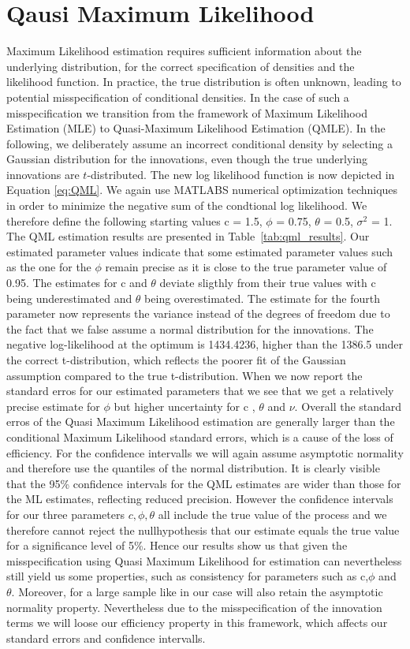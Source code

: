 \documentclass[11pt]{article}
\begin{document}
\section{Qausi Maximum Likelihood}
Maximum Likelihood estimation requires sufficient information about the underlying distribution, for the correct specification of densities and the likelihood function.
In practice, the true distribution is often unknown, leading to potential misspecification of conditional densities. 
In the case of such a misspecification we transition from the framework of 
Maximum Likelihood Estimation (MLE) to Quasi-Maximum Likelihood Estimation (QMLE).
In the following, we deliberately assume an incorrect conditional density by selecting a Gaussian distribution for the innovations, even though the true underlying innovations are \( t \)-distributed.
The new log likelihood function is now depicted in Equation \ref{eq:QML}.
We again use MATLABS numerical optimization techniques in order to minimize the negative sum of the condtional log likelihood.
We therefore define the following starting values c = 1.5, $\phi$ = 0.75, $\theta$ = 0.5, $\sigma^2$ = 1.
The QML estimation results are presented in Table~\ref{tab:qml_results}.
Our estimated parameter values indicate that some estimated parameter values such as the one for the  $\phi$ remain precise as it is close to the true parameter value of 0.95. The estimates for c and $\theta$ deviate sligthly from their true values with c being underestimated and $\theta$ being overestimated.
The estimate for the fourth parameter now represents the variance instead of the degrees of freedom due to the fact that we false assume a normal distribution for the innovations.
The negative log-likelihood at the optimum is 1434.4236, higher than the 1386.5 under the correct t-distribution, which reflects the poorer fit of the Gaussian assumption compared to the true t-distribution.
When we now report the standard erros for our estimated parameters that we  see that we get a relatively precise estimate for $\phi$ but higher uncertainty for c , $\theta$ and $\nu$.
Overall the standard erros of the Quasi Maximum Likelihood estimation are generally larger than the conditional Maximum Likelihood standard errors, which is a cause of the loss of efficiency. For the confidence intervalls we will again assume asymptotic normality and therefore use the quantiles of the normal distribution.
It is clearly visible that the 95\% confidence intervals for the QML estimates are wider than those for the ML estimates, reflecting reduced precision. However the confidence intervals for our three parameters $c, \phi, \theta$ all include the true value of the process and we therefore cannot reject the nullhypothesis that our estimate equals the true value for a significance level of 5\%. Hence our results show us that given the misspecification using Quasi Maximum Likelihood for estimation can nevertheless still yield us some properties, such as consistency for parameters such as c,$\phi$ and $\theta$. Moreover, for a large sample like in our case will also retain the asymptotic normality property.
Nevertheless due to the misspecification of the innovation terms we will loose our efficiency property in this framework, which affects our standard errors and confidence intervalls.
\end{document}
